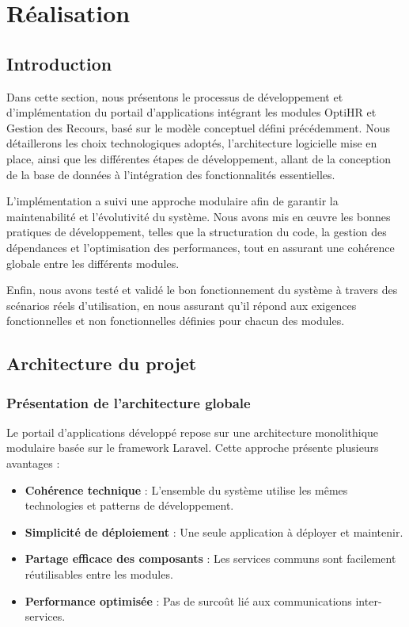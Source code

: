 \chapter{Réalisation}
\clearpage

\section{Introduction}
Dans cette section, nous présentons le processus de développement et d'implémentation du portail d'applications intégrant les modules OptiHR et Gestion des Recours, basé sur le modèle conceptuel défini précédemment. Nous détaillerons les choix technologiques adoptés, l'architecture logicielle mise en place, ainsi que les différentes étapes de développement, allant de la conception de la base de données à l'intégration des fonctionnalités essentielles.

L'implémentation a suivi une approche modulaire afin de garantir la maintenabilité et l'évolutivité du système. Nous avons mis en œuvre les bonnes pratiques de développement, telles que la structuration du code, la gestion des dépendances et l'optimisation des performances, tout en assurant une cohérence globale entre les différents modules.

Enfin, nous avons testé et validé le bon fonctionnement du système à travers des scénarios réels d'utilisation, en nous assurant qu'il répond aux exigences fonctionnelles et non fonctionnelles définies pour chacun des modules.

\section{Architecture du projet}

\subsection{Présentation de l'architecture globale}
Le portail d'applications développé repose sur une architecture monolithique modulaire basée sur le framework Laravel. Cette approche présente plusieurs avantages :

\begin{itemize}
    \item \textbf{Cohérence technique} : L'ensemble du système utilise les mêmes technologies et patterns de développement.
    \item \textbf{Simplicité de déploiement} : Une seule application à déployer et maintenir.
    \item \textbf{Partage efficace des composants} : Les services communs sont facilement réutilisables entre les modules.
    \item \textbf{Performance optimisée} : Pas de surcoût lié aux communications inter-services.
\end{itemize}

